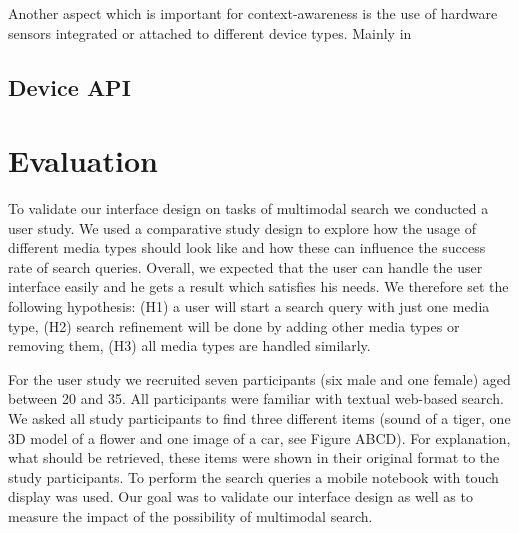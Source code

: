 \documentclass[runningheads,a4paper]{llncs} \usepackage[utf8]{inputenc}
\begin{document}
Another aspect which is important for context-awareness is the use of
hardware sensors integrated or attached to different device types. 
Mainly in

\subsection{Device API}

\section{Evaluation}

To validate our interface design on tasks of multimodal search we conducted a
user study. We used a comparative study design to explore how the usage of
different media types should look like and how these can influence the success
rate of search queries. Overall, we expected that the user can handle the user
interface easily and he gets a result which satisfies his needs. We therefore
set the following hypothesis: (H1) a user will start a search query with just one media type, (H2) search refinement will be done by adding other media types
or removing them, (H3) all media types are handled similarly.


For the user study we recruited seven participants (six male and one female)
aged between 20 and 35. All participants were familiar with textual web-based
search. We asked all study participants to find three different items (sound of
a tiger, one 3D model of a flower and one image of a car, see Figure ABCD). For
explanation, what should be retrieved, these items were shown in their original
format to the study participants. To perform the search queries a mobile
notebook with touch display was used. Our goal was to validate our interface
design as well as to measure the impact of the possibility of multimodal search. 
\end{document}
